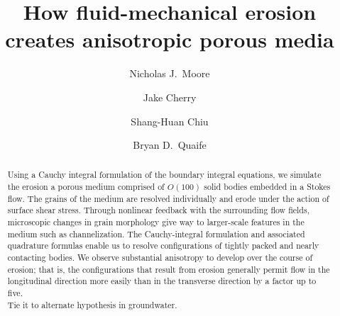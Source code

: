 \documentclass[3p]{elsarticle}
\begin{document}
\title{How fluid-mechanical erosion creates anisotropic porous media}



\author[Colgate]{Nicholas J.~Moore}

\author[FSU]{Jake Cherry}

\author[NJIT]{Shang-Huan Chiu}

\author[FSU]{Bryan D.~Quaife}

\address[Colgate]{Colgate University}
\address[FSU]{Florida State University}
\address[NJIT]{New Jersey Institute of Technology}

\begin{abstract}
Using a Cauchy integral formulation of the boundary integral equations, we simulate the erosion a porous medium comprised of $O(100)$ solid bodies embedded in a Stokes flow. The grains of the medium are resolved individually and erode under the action of surface shear stress. Through nonlinear feedback with the surrounding flow fields, microscopic changes in grain morphology give way to larger-scale features in the medium such as channelization. The Cauchy-integral formulation and associated quadrature formulas enable us to resolve configurations of tightly packed and nearly contacting bodies. We observe substantial anisotropy to develop over the course of erosion; that is, the configurations that result from erosion generally permit flow in the longitudinal direction more easily than in the transverse direction by a factor up to five.  \\
Tie it to alternate hypothesis in groundwater.
\end{abstract}
\maketitle

\end{document}
